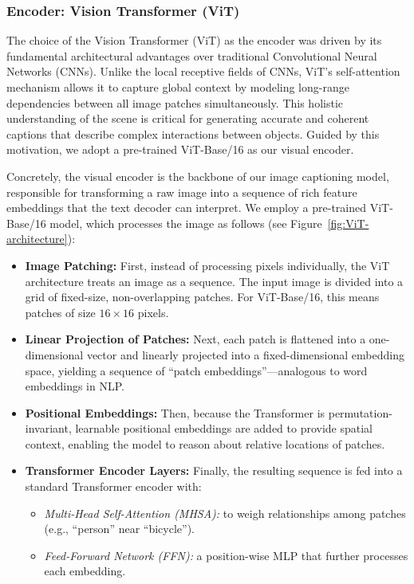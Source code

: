 \subsubsection{Encoder: Vision Transformer (ViT)}

The choice of the Vision Transformer (ViT) as the encoder was driven by its fundamental architectural advantages over traditional Convolutional Neural Networks (CNNs). Unlike the local receptive fields of CNNs, ViT's self-attention mechanism allows it to capture global context by modeling long-range dependencies between all image patches simultaneously. This holistic understanding of the scene is critical for generating accurate and coherent captions that describe complex interactions between objects. Guided by this motivation, we adopt a pre-trained ViT-Base/16 as our visual encoder.

Concretely, the visual encoder is the backbone of our image captioning model, responsible for transforming a raw image into a sequence of rich feature embeddings that the text decoder can interpret. We employ a pre-trained ViT-Base/16 model, which processes the image as follows (see Figure~\ref{fig:ViT-architecture}):

\begin{itemize}
    \item \textbf{Image Patching:} First, instead of processing pixels individually, the ViT architecture treats an image as a sequence. The input image is divided into a grid of fixed-size, non-overlapping patches. For ViT-Base/16, this means patches of size \(16 \times 16\) pixels.
    
    \item \textbf{Linear Projection of Patches:} Next, each patch is flattened into a one-dimensional vector and linearly projected into a fixed-dimensional embedding space, yielding a sequence of ``patch embeddings''—analogous to word embeddings in NLP.
    
    \item \textbf{Positional Embeddings:} Then, because the Transformer is permutation-invariant, learnable positional embeddings are added to provide spatial context, enabling the model to reason about relative locations of patches.
    
    \item \textbf{Transformer Encoder Layers:} Finally, the resulting sequence is fed into a standard Transformer encoder with:
    \begin{itemize}
        \item \textit{Multi-Head Self-Attention (MHSA):} to weigh relationships among patches (e.g., ``person'' near ``bicycle'').
        \item \textit{Feed-Forward Network (FFN):} a position-wise MLP that further processes each embedding.
    \end{itemize}
\end{itemize}

